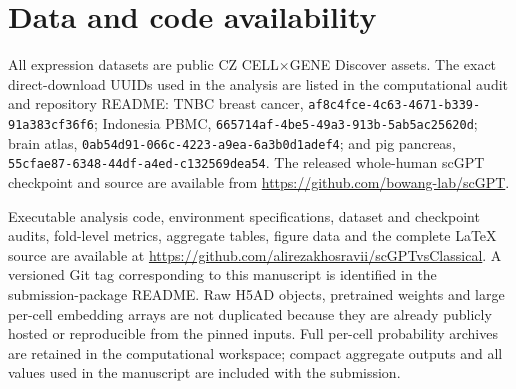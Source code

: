 \section{Data and code availability}

All expression datasets are public CZ CELL$\times$GENE Discover assets. The exact direct-download UUIDs used in the analysis are listed in the computational audit and repository README: TNBC breast cancer, \nolinkurl{af8c4fce-4c63-4671-b339-91a383cf36f6}; Indonesia PBMC, \nolinkurl{665714af-4be5-49a3-913b-5ab5ac25620d}; brain atlas, \nolinkurl{0ab54d91-066c-4223-a9ea-6a3b0d1adef4}; and pig pancreas, \nolinkurl{55cfae87-6348-44df-a4ed-c132569dea54}. The released whole-human scGPT checkpoint and source are available from \url{https://github.com/bowang-lab/scGPT}.

Executable analysis code, environment specifications, dataset and checkpoint audits, fold-level metrics, aggregate tables, figure data and the complete LaTeX source are available at \url{https://github.com/alirezakhosravii/scGPTvsClassical}. A versioned Git tag corresponding to this manuscript is identified in the submission-package README. Raw H5AD objects, pretrained weights and large per-cell embedding arrays are not duplicated because they are already publicly hosted or reproducible from the pinned inputs. Full per-cell probability archives are retained in the computational workspace; compact aggregate outputs and all values used in the manuscript are included with the submission.
